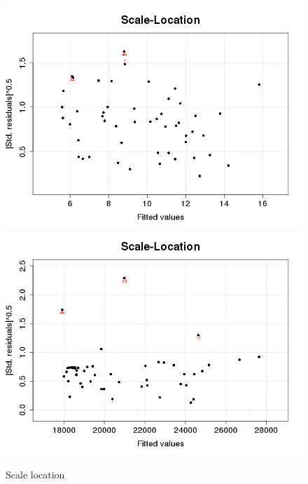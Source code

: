 \begin{figure}[p]
\begin{center}
    \includegraphics[scale=0.4]{imgOT/model1-drawScaleLocation.png}\hspace*{1cm}
	\includegraphics[scale=0.4]{imgOT/model2-drawScaleLocation.png}\\
  \end{center}
  \caption{Scale location}
\end{figure}

